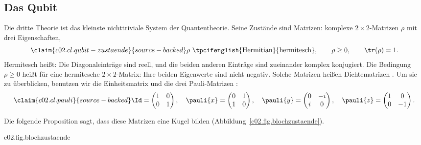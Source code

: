 \subsection{Das Qubit}\label{c02.s4.3}

Die dritte Theorie ist das kleinste nichttriviale System der Quantentheorie. Seine Zustände sind
Matrizen: komplexe $2\times 2$-Matrizen $\rho$ mit drei Eigenschaften,
\begin{equation}\label{c02.eq.qubit}\claim{c02.cl.qubit-zustaende}{source-backed}
  \rho\ \text{\tpcifenglish{Hermitian}{hermitesch}}, \qquad \rho \geq 0, \qquad \tr(\rho) = 1 .
\end{equation}
Hermitesch heißt: Die Diagonaleinträge sind reell, und die beiden anderen Einträge sind
zueinander komplex konjugiert. Die Bedingung $\rho \geq 0$ heißt für eine hermitesche
$2\times 2$-Matrix: Ihre beiden Eigenwerte sind nicht negativ. Solche Matrizen heißen
Dichtematrizen .
Um sie zu überblicken, benutzen wir die Einheitsmatrix und die drei Pauli-Matrizen
:
\begin{equation}\label{c02.eq.pauli}\claim{c02.cl.pauli}{source-backed}
  \Id = \begin{pmatrix} 1 & 0 \\ 0 & 1 \end{pmatrix}, \quad
  \pauli{x} = \begin{pmatrix} 0 & 1 \\ 1 & 0 \end{pmatrix}, \quad
  \pauli{y} = \begin{pmatrix} 0 & -i \\ i & 0 \end{pmatrix}, \quad
  \pauli{z} = \begin{pmatrix} 1 & 0 \\ 0 & -1 \end{pmatrix} .
\end{equation}

Die folgende Proposition sagt, dass diese Matrizen eine Kugel bilden (Abbildung~\ref{c02.fig.blochzustaende}).

\begin{tpcfigure}{c02.fig.blochzustaende}
  \caption{Die Zustände des Qubits als Punkte der Einheitskugel. Die Punkte $\vb{n}$, $-\vb{n}$, $\vb{m}$, $-\vb{m}$ der Oberfläche sind reine Zustände. Der Zustand $\vb{r} = \tfrac12\vb{n}$ im Inneren ist die Mischung $\tfrac34\vb{n} + \tfrac14(-\vb{n})$. Der Mittelpunkt ist die Mitte zwischen $\vb{n}$ und $-\vb{n}$ und ebenso die Mitte zwischen $\vb{m}$ und $-\vb{m}$.}
\end{tpcfigure}

